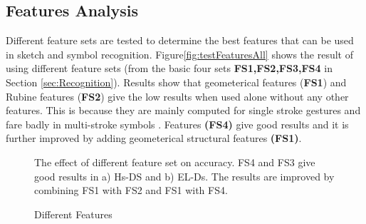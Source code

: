 \documentclass[preprint,10pt,5p,twocolumn]{elsarticle}
\begin{document}
\subsection{Features Analysis}
\label{sec:featexp}
Different feature sets are tested to determine the best features that can be used in sketch and symbol recognition. Figure\ref{fig:testFeaturesAll} shows the result of using different feature sets (from the basic four sets \textbf{FS1,FS2,FS3,FS4} in Section \ref{sec:Recognition}). Results show that geometerical features (\textbf{FS1}) and Rubine features (\textbf{FS2}) \cite{gestureexample12} give the low results when used alone without any other features. This is because they are mainly computed for single stroke gestures and fare badly in multi-stroke symbols \cite{compareFeaturSVM}. Features \textbf{(FS4)} give good results and it is further improved by adding geometerical structural features \textbf{(FS1)}.

 \begin{figure}[h]
	\centering
	\caption{Different Features} The effect of different feature set on accuracy.  FS4 and FS3 give good results in a) Hs-DS and b) EL-Ds. The results are improved by combining FS1 with FS2 and FS1 with FS4.    %
\end{figure}  
\end{document}
